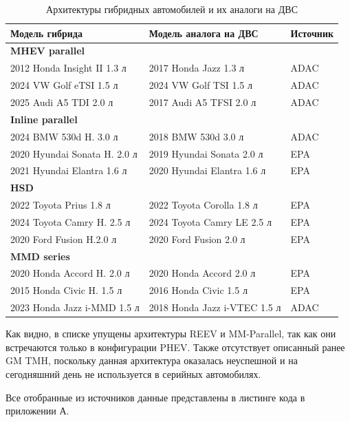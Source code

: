 \begin{table}[h]
    \centering
    \caption{Архитектуры гибридных автомобилей и их аналоги на ДВС}
    \renewcommand{\arraystretch}{1.25}
    \label{tab:hybrids}
    \begin{tabularx}{\textwidth}{l X l}
        \hline
        Модель гибрида & Модель аналога на ДВС & Источник \\
        \hline
        \textbf{MHEV parallel} \\
        2012 Honda Insight II 1.3 л & 2017 Honda Jazz 1.3 л & ADAC \\
        2024 VW Golf eTSI 1.5 л & 2024 VW Golf TSI 1.5 л & ADAC \\
        2025 Audi A5 TDI 2.0 л & 2017 Audi A5 TFSI 2.0 л & ADAC \\
        \hline
        \textbf{Inline parallel } \\
        2024 BMW 530d H. 3.0 л & 2018 BMW 530d 3.0 л & ADAC \\
        2020 Hyundai Sonata H. 2.0 л & 2019 Hyundai Sonata 2.0 л & EPA \\
        2021 Hyundai Elantra 1.6 л & 2020 Hyundai Elantra 1.6 л & EPA \\
        \hline
        \textbf{HSD} \\
        2022 Toyota Prius 1.8 л & 2022 Toyota Corolla 1.8 л & EPA \\
        2024 Toyota Camry H. 2.5 л & 2024 Toyota Camry LE 2.5 л & EPA \\
        2020 Ford Fusion H.2.0 л & 2020 Ford Fusion 2.0 л & EPA \\
        \hline
        \textbf{MMD series} \\
        2020 Honda Accord H. 2.0 л & 2020 Honda Accord 2.0 л & EPA \\
        2015 Honda Civic H. 1.5 л & 2016 Honda Civic 1.5 л & EPA \\
        2023 Honda Jazz i-MMD 1.5 л & 2018 Honda Jazz i-VTEC 1.5 л & ADAC \\
        \hline
    \end{tabularx}
\end{table}

Как видно, в списке упущены архитектуры REEV и MM-Parallel, так как они встречаются только в конфигурации PHEV. Также отсутствует описанный ранее GM TMH, поскольку данная архитектура оказалась неуспешной и на сегодняшний день не используется в серийных автомобилях.

Все отобранные из источников данные представлены в листинге кода в приложении А.

